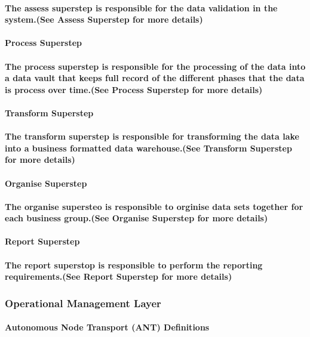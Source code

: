 \documentclass{acm_proc_article-sp}
\begin{document}
\paragraph{The assess superstep is responsible for the data validation in the system.(See Assess Superstep for more details)}
\paragraph{\textbf{Process Superstep}}
\paragraph{The process superstep is responsible for the processing of the data into a data vault that keeps full record of the different phases that the data is process over time.(See Process Superstep for more details)}
\paragraph{\textbf{Transform Superstep}}
\paragraph{The transform superstep is responsible for transforming the data lake into a business formatted data warehouse.(See Transform Superstep for more details)}
\paragraph{\textbf{Organise Superstep}}
\paragraph{The organise supersteo is responsible to orginise data sets together for each business group.(See Organise Superstep for more details)}
\paragraph{\textbf{Report Superstep}}
\paragraph{The report superstop is responsible to perform the reporting requirements.(See Report Superstep for more details)}
\subsubsection{Operational Management Layer}
\paragraph{\textbf{Autonomous Node Transport (ANT) Definitions}}
\end{document}
